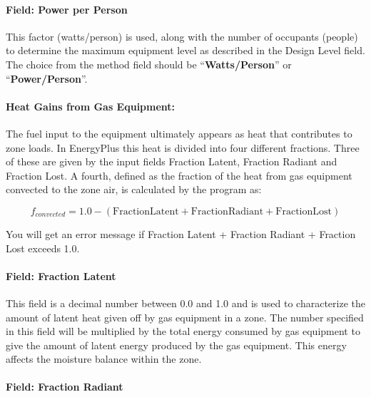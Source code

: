 \paragraph{Field: Power per Person}\label{field-power-per-person}

This factor (watts/person) is used, along with the number of occupants (people) to determine the maximum equipment level as described in the Design Level field. The choice from the method field should be ``\textbf{Watts/Person}'' or ``\textbf{Power/Person}''.

\paragraph{Heat Gains from Gas Equipment:}\label{heat-gains-from-gas-equipment}

The fuel input to the equipment ultimately appears as heat that contributes to zone loads. In EnergyPlus this heat is divided into four different fractions. Three of these are given by the input fields Fraction Latent, Fraction Radiant and Fraction Lost. A fourth, defined as the fraction of the heat from gas equipment convected to the zone air, is calculated by the program as:

\begin{equation}
  f_{convected} = 1.0 - (\mathrm{Fraction Latent} + \mathrm{Fraction Radiant} + \mathrm{Fraction Lost})
\end{equation}

You will get an error message if Fraction Latent + Fraction Radiant + Fraction Lost exceeds 1.0.

\paragraph{Field: Fraction Latent}\label{field-fraction-latent-1}

This field is a decimal number between 0.0 and 1.0 and is used to characterize the amount of latent heat given off by gas equipment in a zone. The number specified in this field will be multiplied by the total energy consumed by gas equipment to give the amount of latent energy produced by the gas equipment. This energy affects the moisture balance within the zone.

\paragraph{Field: Fraction Radiant}\label{field-fraction-radiant-3}

